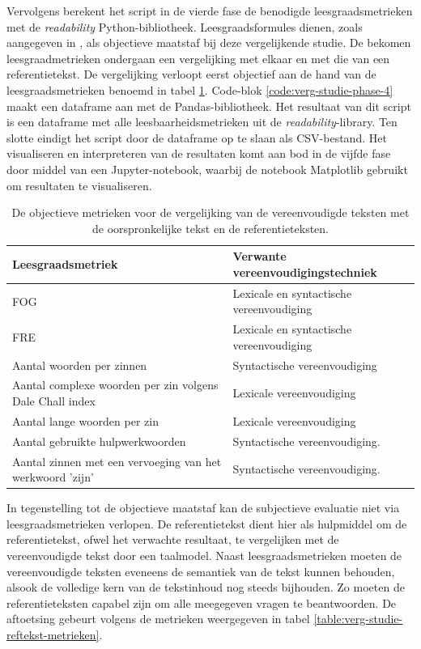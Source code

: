 % 
Vervolgens berekent het script in de vierde fase de benodigde leesgraadsmetrieken met de \textit{readability} Python-bibliotheek. Leesgraadsformules dienen, zoals aangegeven in \textcite{Nenkova2004}, als objectieve maatstaf bij deze vergelijkende studie. De bekomen leesgraadmetrieken ondergaan een vergelijking met elkaar en met die van een referentietekst. De vergelijking verloopt eerst objectief aan de hand van de leesgraadsmetrieken benoemd in tabel \ref{table:verg-studie-metrieken}. Code-blok \ref{code:verg-studie-phase-4} maakt een dataframe aan met de Pandas-bibliotheek. Het resultaat van dit script is een dataframe met alle leesbaarheidsmetrieken uit de \textit{readability}-library. Ten slotte eindigt het script door de dataframe op te slaan als CSV-bestand. Het visualiseren en interpreteren van de resultaten komt aan bod in de vijfde fase door middel van een Jupyter-notebook, waarbij de notebook Matplotlib gebruikt om resultaten te visualiseren.

\begin{center}
	\begin{table}[H]
		\begin{tabular}{ | m{8cm} | m{7cm} | } 
			\hline
			\textbf{Leesgraadsmetriek} & \textbf{Verwante vereenvoudigingstechniek }\\
			\hline
			FOG & Lexicale en syntactische vereenvoudiging \\
			\hline
			FRE & Lexicale en syntactische vereenvoudiging \\
			\hline
			Aantal woorden per zinnen & Syntactische vereenvoudiging \\
			\hline
			Aantal complexe woorden per zin volgens Dale Chall index & Lexicale vereenvoudiging \\
			\hline
			Aantal lange woorden per zin & Lexicale vereenvoudiging \\
			\hline
			Aantal gebruikte hulpwerkwoorden & Syntactische vereenvoudiging. \\
			\hline
			Aantal zinnen met een vervoeging van het werkwoord 'zijn' & Syntactische vereenvoudiging. \\
			\hline
		\end{tabular}
		\caption{De objectieve metrieken voor de vergelijking van de vereenvoudigde teksten met de oorspronkelijke tekst en de referentieteksten.}
		\label{table:verg-studie-metrieken}
	\end{table}
\end{center}

%
In tegenstelling tot de objectieve maatstaf kan de subjectieve evaluatie niet via leesgraadsmetrieken verlopen. De referentietekst dient hier als hulpmiddel om de referentietekst, ofwel het verwachte resultaat, te vergelijken met de vereenvoudigde tekst door een taalmodel. Naast leesgraadsmetrieken moeten de vereenvoudigde teksten eveneens de semantiek van de tekst kunnen behouden, alsook de volledige kern van de tekstinhoud nog steeds bijhouden. Zo moeten de referentieteksten capabel zijn om alle meegegeven vragen te beantwoorden. De aftoetsing gebeurt volgens de metrieken weergegeven in tabel \ref{table:verg-studie-reftekst-metrieken}.

